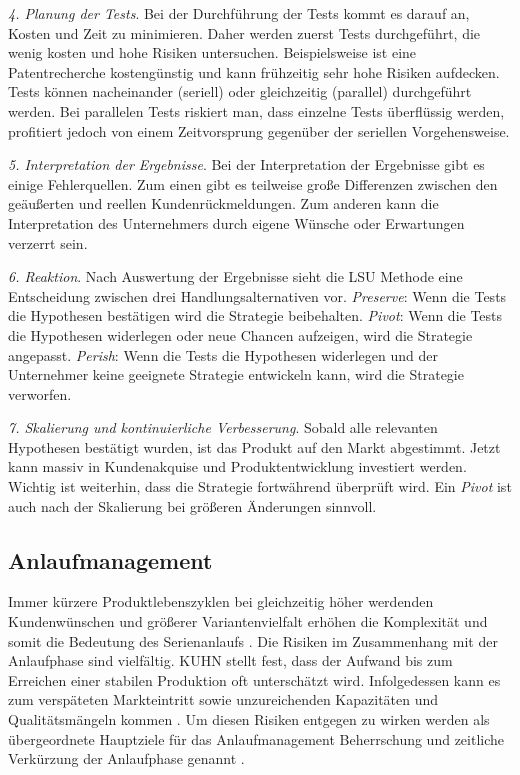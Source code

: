 \textit{4. Planung der Tests}. Bei der Durchführung der Tests kommt es darauf an, Kosten und Zeit zu minimieren. Daher werden zuerst Tests durchgeführt, die wenig kosten und hohe Risiken untersuchen. Beispielsweise ist eine Patentrecherche kostengünstig und kann frühzeitig sehr hohe Risiken aufdecken. Tests können nacheinander (seriell) oder gleichzeitig (parallel) durchgeführt werden. Bei parallelen Tests riskiert man, dass einzelne Tests überflüssig werden, profitiert jedoch von einem Zeitvorsprung gegenüber der seriellen Vorgehensweise. 

\textit{5. Interpretation der Ergebnisse}. Bei der Interpretation der Ergebnisse gibt es einige Fehlerquellen. Zum einen gibt es teilweise große Differenzen zwischen den geäußerten und reellen Kundenrückmeldungen. Zum anderen kann die Interpretation des Unternehmers durch eigene Wünsche oder Erwartungen verzerrt sein.

\textit{6. Reaktion}. Nach Auswertung der Ergebnisse sieht die LSU Methode eine Entscheidung zwischen drei Handlungsalternativen vor. \textit{Preserve}: Wenn die Tests die Hypothesen bestätigen wird die Strategie beibehalten. \textit{Pivot}: Wenn die Tests die Hypothesen widerlegen oder neue Chancen aufzeigen, wird die Strategie angepasst. \textit{Perish}: Wenn die Tests die Hypothesen widerlegen und der Unternehmer keine geeignete Strategie entwickeln kann, wird die Strategie verworfen. 

\textit{7. Skalierung und kontinuierliche Verbesserung}. Sobald alle relevanten Hypothesen bestätigt wurden, ist das Produkt auf den Markt abgestimmt. Jetzt kann massiv in Kundenakquise und Produktentwicklung investiert werden. Wichtig ist weiterhin, dass die Strategie fortwährend überprüft wird. Ein \textit{Pivot} ist auch nach der Skalierung bei größeren Änderungen sinnvoll. 


\subsection{Anlaufmanagement}
Immer kürzere Produktlebenszyklen bei gleichzeitig höher werdenden Kundenwünschen und größerer Variantenvielfalt erhöhen die Komplexität und somit die Bedeutung des Serienanlaufs \cite{Kuhn2002,Schuh2004}. Die Risiken im Zusammenhang mit der Anlaufphase sind vielfältig. KUHN %
stellt fest, dass der Aufwand bis zum Erreichen einer stabilen Produktion oft unterschätzt wird. Infolgedessen kann es zum verspäteten Markteintritt sowie unzureichenden Kapazitäten und Qualitätsmängeln kommen \cite{Kuhn2002}. Um diesen Risiken entgegen zu wirken werden als übergeordnete Hauptziele für das Anlaufmanagement Beherrschung und zeitliche Verkürzung der Anlaufphase genannt \cite{Kuhn2002, Schmitt2015}. 

